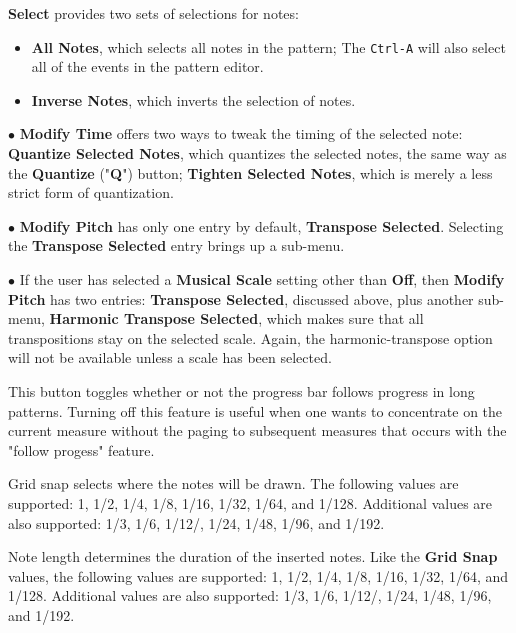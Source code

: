    \textbf{Select} provides two sets of selections for notes:
   \begin{itemize}
      \item \textbf{All Notes}, which selects all notes in the pattern;
         The  \texttt{Ctrl-A} will also select
         all of the events in the pattern editor.
      \item \textbf{Inverse Notes}, which inverts the selection of notes.
   \end{itemize}

   $\bullet$ \textbf{Modify Time} offers two ways to tweak the timing of the
   selected note:
   \textbf{Quantize Selected Notes}, which quantizes the selected
   notes, the same way as the \textbf{Quantize} ("\textbf{Q}") button;
   \textbf{Tighten Selected Notes}, which is merely a less
   strict form of quantization.

   $\bullet$ \textbf{Modify Pitch} has only one entry by default,
   \textbf{Transpose Selected}.
   Selecting the \textbf{Transpose Selected} entry brings up a sub-menu.

   $\bullet$ If the user has selected a
   \textbf{Musical Scale} setting other than \textbf{Off},
   then \textbf{Modify Pitch} has two entries:
   \textbf{Transpose Selected}, discussed above, plus
   another sub-menu,
   \textbf{Harmonic Transpose Selected}, which makes sure that all
   transpositions stay on the selected scale.
   Again, the harmonic-transpose option will not be available unless a scale
   has been selected.

   This button toggles whether or not the progress bar follows
   progress in long patterns.  Turning off this feature is useful when
   one wants to concentrate on the current measure without the paging to
   subsequent measures that occurs with the "follow progess" feature.

   Grid snap selects where the notes will be drawn.
   The following values are supported:
   1, 1/2, 1/4, 1/8, 1/16, 1/32, 1/64, and 1/128.
   Additional values are also supported:
   1/3, 1/6, 1/12/, 1/24, 1/48, 1/96, and 1/192.

   Note length determines the duration of the inserted notes.
   Like the \textbf{Grid Snap} values,
   the following values are supported:
   1, 1/2, 1/4, 1/8, 1/16, 1/32, 1/64, and 1/128.
   Additional values are also supported:
   1/3, 1/6, 1/12/, 1/24, 1/48, 1/96, and 1/192.

